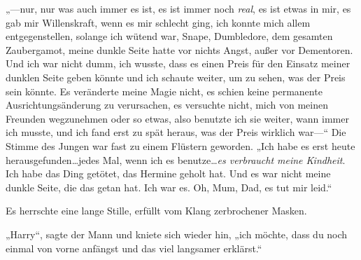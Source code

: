„—nur, nur was auch immer es ist, es ist immer noch \emph{real}, es ist etwas in mir, es gab mir Willenskraft, wenn es mir schlecht ging, ich konnte mich allem entgegenstellen, solange ich wütend war, Snape, Dumbledore, dem gesamten Zaubergamot, meine dunkle Seite hatte vor nichts Angst, außer vor Dementoren. Und ich war nicht dumm, ich wusste, dass es einen Preis für den Einsatz meiner dunklen Seite geben könnte und ich schaute weiter, um zu sehen, was der Preis sein könnte. Es veränderte meine Magie nicht, es schien keine permanente Ausrichtungsänderung zu verursachen, es versuchte nicht, mich von meinen Freunden wegzunehmen oder so etwas, also benutzte ich sie weiter, wann immer ich musste, und ich fand erst zu spät heraus, was der Preis wirklich war—“
Die Stimme des Jungen war fast zu einem Flüstern geworden.
„Ich habe es erst heute herausgefunden…jedes Mal, wenn ich es benutze…\emph{es verbraucht meine Kindheit}. Ich habe das Ding getötet, das Hermine geholt hat. Und es war nicht meine dunkle Seite, die das getan hat. Ich war es. Oh, Mum, Dad, es tut mir leid.“

Es herrschte eine lange Stille, erfüllt vom Klang zerbrochener Masken.

„Harry“, sagte der Mann und kniete sich wieder hin, „ich möchte, dass du noch einmal von vorne anfängst und das viel langsamer erklärst.“



